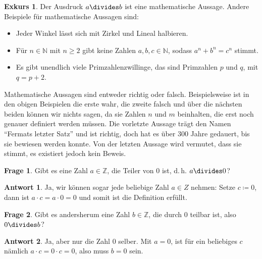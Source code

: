 \documentclass[a4paper,ngerman,12pt]{scrartcl}
\newcommand{\N}{\mathbb{N}}
\newcommand{\Z}{\mathbb{Z}}
\theoremstyle{definition}
\newtheorem*{frage}{Frage}
\newtheorem*{antw}{Antwort}
\newtheorem*{exk}{Exkurs}
\newenvironment{exkurs}{\begin{shaded}\begin{exk}}{\end{exk}\end{shaded}}
\begin{document}
\begin{exkurs}
  Der Ausdruck $a \divides b$ ist eine mathematische Aussage. Andere Beispiele für mathematische Aussagen sind:
  \begin{itemize}
    \item Jeder Winkel lässt sich mit Zirkel und Lineal halbieren.
    \item Für $n \in \N$ mit $n \geq 2$ gibt keine Zahlen $a, b, c \in \N$, sodass $a^n + b^n = c^n$ stimmt.
    \item Es gibt unendlich viele Primzahlenzwillinge, das sind Primzahlen $p$ und $q$, mit $q = p + 2$.
  \end{itemize}

  Mathematische Aussagen sind entweder richtig oder falsch. Beispielsweise ist in den obigen Beispielen die erste wahr, die zweite falsch und über die nächsten beiden können wir nichts sagen, da sie Zahlen $n$ und $m$ beinhalten, die erst noch genauer definiert werden müssen. Die vorletzte Aussage trägt den Namen "`Fermats letzter Satz"' und ist richtig, doch hat es über 300 Jahre gedauert, bis sie bewiesen werden konnte. Von der letzten Aussage wird vermutet, dass sie stimmt, es existiert jedoch kein Beweis.
\end{exkurs}

\begin{frage}
  Gibt es eine Zahl $a \in \Z$, die Teiler von $0$ ist, d.\,h. $a \divides 0$?
\end{frage}

\begin{antw}
  Ja, wir können sogar jede beliebige Zahl $a \in Z$ nehmen: Setze $c \coloneqq 0$, dann ist $a \cdot c = a \cdot 0 = 0$ und somit ist die Definition erfüllt.
\end{antw}

\begin{frage}
  Gibt es andersherum eine Zahl $b \in \Z$, die durch $0$ teilbar ist, also $0 \divides b$?
\end{frage}

\begin{antw}
  Ja, aber nur die Zahl $0$ selber. Mit $a = 0$, ist für ein beliebiges $c$ nämlich $a \cdot c = 0 \cdot c = 0$, also muss $b = 0$ sein.
\end{antw}
\end{document}
